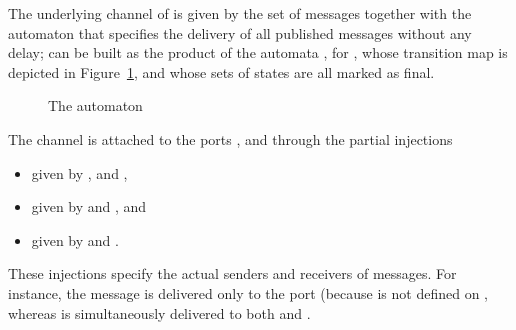 \documentclass{LMCS}
\begin{document}
\begin{exa}
    The underlying channel of  is given by the set of messages  together with the automaton  that specifies the delivery of all published messages without any delay;  can be built as the product of the automata , for , whose transition map is depicted in Figure~\ref{figure:connection-LM-automaton}, and whose sets of states are all marked as final.

    \begin{figure}[h]
      \centering
      

      \caption{The automaton }
      \label{figure:connection-LM-automaton}
    \end{figure}

    The channel is attached to the ports ,  and  through the partial injections
    \begin{itemize}
      
    \item  given by ,  and ,
      
    \item  given by  and , and
      
    \item  given by  and .
      
    \end{itemize}
    These injections specify the actual senders and receivers of messages.  For instance, the message  is delivered only to the port  (because  is not defined on , whereas  is simultaneously delivered to both  and .
  \end{exa}
\end{document}
